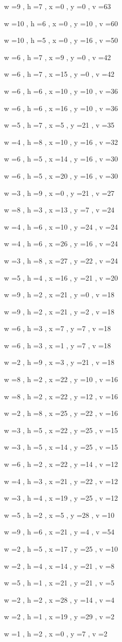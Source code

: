 \documentclass[11pt]{article}
\begin{document}
w =9 , h =7 , x =0 , y =0 , v =63
\par
w =10 , h =6 , x =0 , y =10 , v =60
\par
w =10 , h =5 , x =0 , y =16 , v =50
\par
w =6 , h =7 , x =9 , y =0 , v =42
\par
w =6 , h =7 , x =15 , y =0 , v =42
\par
w =6 , h =6 , x =10 , y =10 , v =36
\par
w =6 , h =6 , x =16 , y =10 , v =36
\par
w =5 , h =7 , x =5 , y =21 , v =35
\par
w =4 , h =8 , x =10 , y =16 , v =32
\par
w =6 , h =5 , x =14 , y =16 , v =30
\par
w =6 , h =5 , x =20 , y =16 , v =30
\par
w =3 , h =9 , x =0 , y =21 , v =27
\par
w =8 , h =3 , x =13 , y =7 , v =24
\par
w =4 , h =6 , x =10 , y =24 , v =24
\par
w =4 , h =6 , x =26 , y =16 , v =24
\par
w =3 , h =8 , x =27 , y =22 , v =24
\par
w =5 , h =4 , x =16 , y =21 , v =20
\par
w =9 , h =2 , x =21 , y =0 , v =18
\par
w =9 , h =2 , x =21 , y =2 , v =18
\par
w =6 , h =3 , x =7 , y =7 , v =18
\par
w =6 , h =3 , x =1 , y =7 , v =18
\par
w =2 , h =9 , x =3 , y =21 , v =18
\par
w =8 , h =2 , x =22 , y =10 , v =16
\par
w =8 , h =2 , x =22 , y =12 , v =16
\par
w =2 , h =8 , x =25 , y =22 , v =16
\par
w =3 , h =5 , x =22 , y =25 , v =15
\par
w =3 , h =5 , x =14 , y =25 , v =15
\par
w =6 , h =2 , x =22 , y =14 , v =12
\par
w =4 , h =3 , x =21 , y =22 , v =12
\par
w =3 , h =4 , x =19 , y =25 , v =12
\par
w =5 , h =2 , x =5 , y =28 , v =10
\par
w =9 , h =6 , x =21 , y =4 , v =54
\par
w =2 , h =5 , x =17 , y =25 , v =10
\par
w =2 , h =4 , x =14 , y =21 , v =8
\par
w =5 , h =1 , x =21 , y =21 , v =5
\par
w =2 , h =2 , x =28 , y =14 , v =4
\par
w =2 , h =1 , x =19 , y =29 , v =2
\par
w =1 , h =2 , x =0 , y =7 , v =2
\par
\newpage
\end{document}
